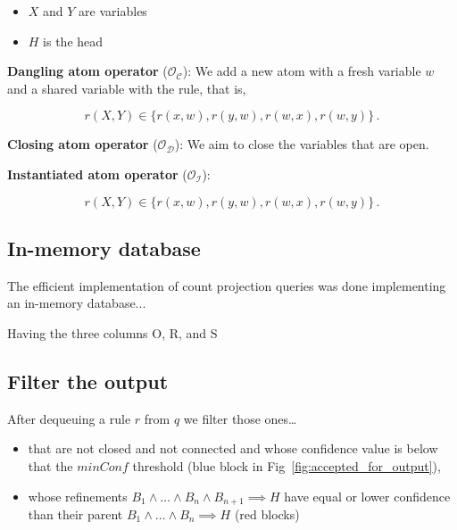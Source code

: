 \documentclass{article}
\begin{document}
\begin{itemize}
    \item $X$ and $Y$ are variables
    \item $H$ is the head
\end{itemize}
 
\noindent \textbf{Dangling atom operator} ($\mathcal{O}_\mathcal{C}$): We add a new atom with a
fresh variable $w$ and a shared variable with the rule, that is, 

\begin{equation}
    r(X, Y) \in \{ r(x, w), r(y, w), r(w, x), r(w, y) \}\,.
\end{equation}

\noindent \textbf{Closing atom operator} ($\mathcal{O}_\mathcal{D}$): We aim to close the variables
that are open.

\noindent \textbf{Instantiated atom operator} ($\mathcal{O}_\mathcal{I}$):

\begin{equation}
    r(X, Y) \in \{ r(x, w), r(y, w), r(w, x), r(w, y) \}\,.
\end{equation}

\subsection{In-memory database}
\label{ssec:in_memory_database}

The efficient implementation of count projection queries was done implementing
an in-memory database...

Having the three columns O, R, and S

\subsection{Filter the output}
\label{ssec:filter_output}

After dequeuing a rule $r$ from $q$ we filter those ones\ldots

\begin{itemize}
    \item that are not closed and not connected and whose confidence value is 
        below that the $minConf$ threshold (blue block in Fig~\ref{fig:accepted_for_output}),
    \item whose refinements $B_1 \land \ldots \land B_n \land B_{n+1} \implies H$ 
        have equal or lower confidence than their parent 
        $B_1 \land \ldots \land B_n \implies H$ (red blocks)
\end{itemize}
\end{document}
